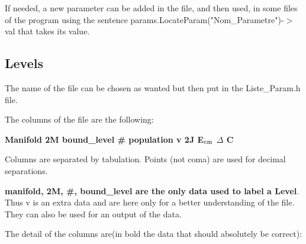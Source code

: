 \documentclass[amsmath,amssymb,nofootinbib]{revtex4-2}
\begin{document}
If needed, a new parameter can be added in the file, and then used, in some files of the program using the sentence
 params.LocateParam("Nom\_Parametre")-$>$val
that takes its value.




\subsection{Levels}


The name of the file can be chosen as wanted but then put in the Liste\_Param.h file.

The columns of the file are the following:

	\bigskip
	
 \textbf{ Manifold	2M	bound\_level	\#	population	v	2J	E$_{\rm cm}$	$\Delta$	C}
		\bigskip

Columns are separated by tabulation. Points (not coma) are used for decimal separations.


 \textbf{ manifold, 2M, \#, bound\_level  are the only data used to label a Level}. Thus v  is an  extra data and are here only for a better understanding of the file. They can also be used for an output of the data.

The detail of the columns are(in bold the data that should absolutely be correct):
\end{document}
